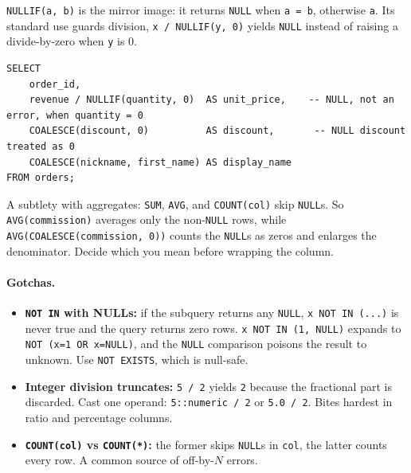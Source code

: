 \texttt{NULLIF(a, b)} is the mirror image: it returns \texttt{NULL} when
\texttt{a = b}, otherwise \texttt{a}. Its standard use guards division,
\texttt{x / NULLIF(y, 0)} yields \texttt{NULL} instead of raising a
divide-by-zero when \texttt{y} is 0.

\begin{lstlisting}[style=sql, caption={NULLIF guards division, COALESCE supplies defaults}]
SELECT
    order_id,
    revenue / NULLIF(quantity, 0)  AS unit_price,    -- NULL, not an error, when quantity = 0
    COALESCE(discount, 0)          AS discount,       -- NULL discount treated as 0
    COALESCE(nickname, first_name) AS display_name
FROM orders;
\end{lstlisting}

A subtlety with aggregates: \texttt{SUM}, \texttt{AVG}, and
\texttt{COUNT(col)} skip \texttt{NULL}s. So \texttt{AVG(commission)} averages
only the non-\texttt{NULL} rows, while \texttt{AVG(COALESCE(commission, 0))}
counts the \texttt{NULL}s as zeros and enlarges the denominator. Decide which
you mean before wrapping the column.

\newpage

\paragraph{Gotchas.}
\begin{itemize}
  \item \textbf{\texttt{NOT IN} with NULLs:} if the subquery returns any
  \texttt{NULL}, \texttt{x NOT IN (...)} is never true and the query returns
  zero rows. \texttt{x NOT IN (1, NULL)} expands to
  \texttt{NOT (x=1 OR x=NULL)}, and the \texttt{NULL} comparison poisons the
  result to unknown. Use \texttt{NOT EXISTS}, which is null-safe.
  \item \textbf{Integer division truncates:} \texttt{5 / 2} yields \texttt{2}
  because the fractional part is discarded. Cast one operand:
  \texttt{5::numeric / 2} or \texttt{5.0 / 2}. Bites hardest in ratio and
  percentage columns.
  \item \textbf{\texttt{COUNT(col)} vs \texttt{COUNT(*)}:} the former skips
  \texttt{NULL}s in \texttt{col}, the latter counts every row. A common source
  of off-by-$N$ errors.
\end{itemize}